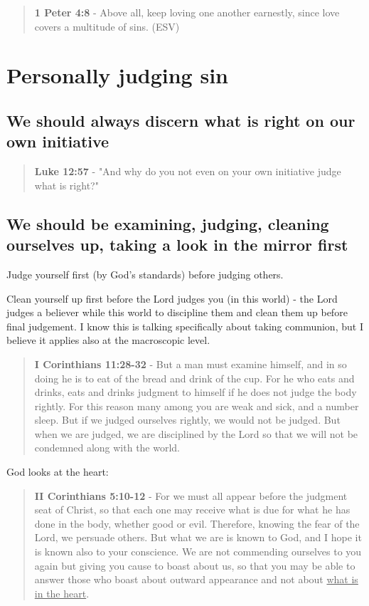 \documentclass[11pt]{article}
\begin{document}
\begin{quote}
\textbf{1 Peter 4:8} -  Above all, keep loving one another earnestly, since love covers a multitude of sins.  (ESV)
\end{quote}

\section{Personally judging sin}
\label{sec:org8e5771a}
\subsection{We should always discern what is right on our own initiative}
\label{sec:org197fdc3}
\begin{quote}
\textbf{Luke 12:57} - "And why do you not even on your own initiative judge what is right?"
\end{quote}

\subsection{We should be examining, judging, cleaning ourselves up, taking a look in the mirror first}
\label{sec:org3c05513}
Judge yourself first (by God's standards) before judging others.

Clean yourself up first before the Lord judges you (in this world) - the Lord judges a believer while this world to discipline them and clean them up before final judgement.
I know this is talking specifically about taking communion, but I believe it applies also at the macroscopic level.

\begin{quote}
\textbf{I Corinthians 11:28-32} - But a man must examine himself, and in so doing he is to eat of the bread and drink of the cup.  For he who eats and drinks, eats and drinks judgment to himself if he does not judge the body rightly.  For this reason many among you are weak and sick, and a number sleep.  But if we judged ourselves rightly, we would not be judged.  But when we are judged, we are disciplined by the Lord so that we will not be condemned along with the world.
\end{quote}

God looks at the heart:

\begin{quote}
\textbf{II Corinthians 5:10-12} - For we must all appear before the judgment seat of Christ, so that each one may receive what is due for what he has done in the body, whether good or evil. Therefore, knowing the fear of the Lord, we persuade others. But what we are is known to God, and I hope it is known also to your conscience. We are not commending ourselves to you again but giving you cause to boast about us, so that you may be able to answer those who boast about outward appearance and not about \uline{what is in the heart}.
\end{quote}
\end{document}
